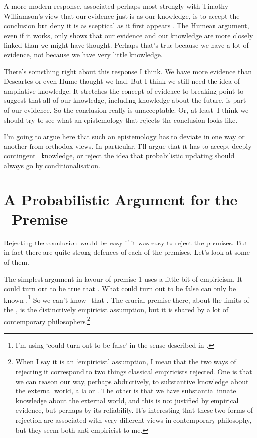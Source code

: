 A more modern response, associated perhaps most strongly with Timothy Williamson's view that our evidence just is as our knowledge, is to accept the conclusion but deny it is as sceptical as it first appears \citep{Williamson1998-WILCOK, Williamson2000-WILSAE-2}. The Humean argument, even if it works, only shows that our evidence and our knowledge are more closely linked than we might have thought. Perhaps that's true because we have a lot of evidence, not because we have very little knowledge.

There's something right about this response I think. We have more evidence than Descartes or even Hume thought we had. But I think we still need the idea of ampliative knowledge. It stretches the concept of evidence to breaking point to suggest that all of our knowledge, including knowledge about the future, is part of our evidence. So the conclusion really is unacceptable. Or, at least, I think we should try to see what an epistemology that rejects the conclusion looks like.

I'm going to argue here that such an epistemology has to deviate in one way or another from orthodox views. In particular, I'll argue that it has to accept deeply contingent \apr\ knowledge, or reject the idea that probabilistic updating should always go by conditionalisation. 

\section{A Probabilistic Argument for the \apo\ Premise}

Rejecting the conclusion would be easy if it was easy to reject the premises. But in fact there are quite strong defences of each of the premises. Let's look at some of them.

The simplest argument in favour of premise 1 uses a little bit of empiricism. It could turn out to be true that \ECH. What could turn out to be false can only be known \apo.\footnote{I'm using `could turn out to be false' in the sense described in \citet{Yablo2002}.} So we can't know \apr\ that \ECH. The crucial premise there, about the limits of the \apr, is the distinctively empiricist assumption, but it is shared by a lot of contemporary philosophers.\footnote{When I say it is an `empiricist' assumption, I mean that the two ways of rejecting it correspond to two things classical empiricists rejected. One is that we can reason our way, perhaps abductively, to substantive knowledge about the external world, a la \citet{Vogel1990} or \citet{Bonjour1997}
. The other is that we have substantial innate knowledge about the external world, and this is not justified by empirical evidence, but perhaps by its reliability. It's interesting that these two forms of rejection are associated with very different views in contemporary philosophy, but they seem both anti-empiricist to me.}

